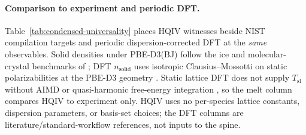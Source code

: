 \documentclass[11pt,notitlepage]{amsart}
\begin{document}
\paragraph{Comparison to experiment and periodic DFT.}
Table~\ref{tab:condensed-universality} places HQIV witnesses beside NIST compilation
targets \cite{nistwebbook_h2o,nistwebbook_ch4,nistwebbook_nh3,nistwebbook_hf,crc2023handbook}
and periodic dispersion-corrected DFT at the \emph{same} observables.
Solid densities under PBE-D3(BJ) follow the ice and molecular-crystal benchmarks of
\cite{santra2013ice,brandenburg2016jctc,grimme2011d3}; DFT $n_{\mathrm{solid}}$ uses
isotropic Clausius--Mossotti on static polarizabilities at the PBE-D3 geometry
\cite{reilly2013mbd,goerigk2017gmtkn55}.
Static lattice DFT does not supply $T_{\mathrm{sl}}$ without AIMD or quasi-harmonic
free-energy integration \cite{gillan2016perspective}, so the melt column compares HQIV
to experiment only.
HQIV uses no per-species lattice constants, dispersion parameters, or basis-set choices;
the DFT columns are literature/standard-workflow references, not inputs to the spine.
\end{document}

